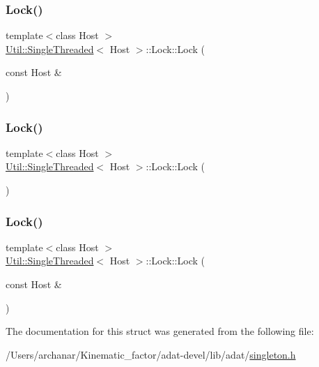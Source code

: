 \subsubsection{\texorpdfstring{Lock()}{Lock()}\hspace{0.1cm}{\footnotesize\ttfamily [4/6]}}
{\footnotesize\ttfamily template$<$class Host $>$ \\
\mbox{\hyperlink{classUtil_1_1SingleThreaded}{Util\+::\+Single\+Threaded}}$<$ Host $>$\+::Lock\+::\+Lock (\begin{DoxyParamCaption}\item[{const Host \&}]{ }\end{DoxyParamCaption})\hspace{0.3cm}{\ttfamily [inline]}}

\mbox{\label{structUtil_1_1SingleThreaded_1_1Lock_afd207df7a7a755030a139f082bdd3ac7}} 
\subsubsection{\texorpdfstring{Lock()}{Lock()}\hspace{0.1cm}{\footnotesize\ttfamily [5/6]}}
{\footnotesize\ttfamily template$<$class Host $>$ \\
\mbox{\hyperlink{classUtil_1_1SingleThreaded}{Util\+::\+Single\+Threaded}}$<$ Host $>$\+::Lock\+::\+Lock (\begin{DoxyParamCaption}{ }\end{DoxyParamCaption})\hspace{0.3cm}{\ttfamily [inline]}}

\mbox{\label{structUtil_1_1SingleThreaded_1_1Lock_ad3f29b21cc23169f60d96950ad9cb99f}} 
\subsubsection{\texorpdfstring{Lock()}{Lock()}\hspace{0.1cm}{\footnotesize\ttfamily [6/6]}}
{\footnotesize\ttfamily template$<$class Host $>$ \\
\mbox{\hyperlink{classUtil_1_1SingleThreaded}{Util\+::\+Single\+Threaded}}$<$ Host $>$\+::Lock\+::\+Lock (\begin{DoxyParamCaption}\item[{const Host \&}]{ }\end{DoxyParamCaption})\hspace{0.3cm}{\ttfamily [inline]}}



The documentation for this struct was generated from the following file\+:\begin{DoxyCompactItemize}
\item 
/\+Users/archanar/\+Kinematic\+\_\+factor/adat-\/devel/lib/adat/\mbox{\hyperlink{adat-devel_2lib_2adat_2singleton_8h}{singleton.\+h}}\end{DoxyCompactItemize}
